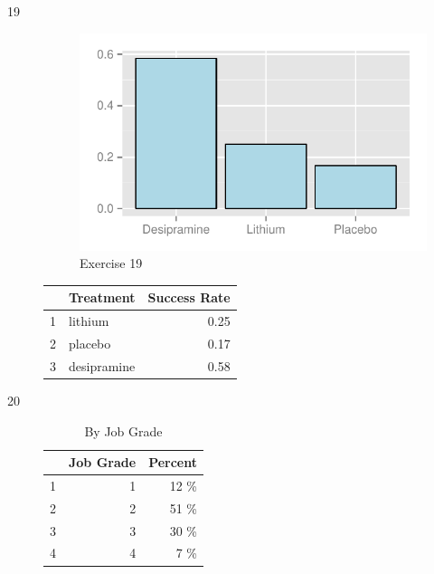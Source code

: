 \documentclass[letterpaper, landscape]{exam}
\begin{document}
  \ifprintanswers
    \begin{description}

      \item[19]     
        \begin{figure}[H]
          \centering
          \includegraphics{figures/ex19.pdf}
          \caption{Exercise 19}
        \end{figure}

        \begin{table}[H]
          \centering
          \begin{tabular}{rlr}
            \toprule
              & Treatment   & Success Rate \\
            \midrule
            1 & lithium     & 0.25 \\
            2 & placebo     & 0.17 \\
            3 & desipramine & 0.58 \\
            \bottomrule
          \end{tabular}
        \end{table}

      \item[20]
        \begin{table}[H]
          \centering
          \begin{tabular}{rrr}
            \toprule
              & Job Grade & Percent \\
            \midrule
            1 & 1         & 12 \% \\
            2 & 2         & 51 \% \\
            3 & 3         & 30 \% \\
            4 & 4         & 7 \% \\
            \bottomrule
          \end{tabular}
          \caption{By Job Grade}
        \end{table}


\end{description}
\end{document}
